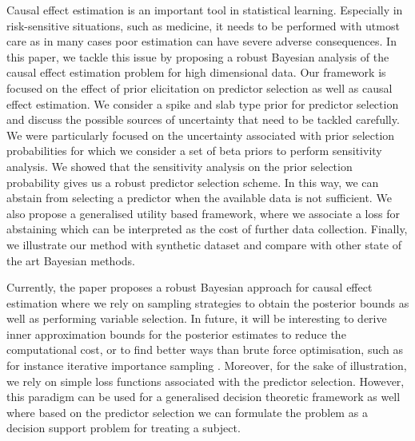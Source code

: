 \documentclass[preprint,12pt]{elsarticle}
\begin{document}
Causal effect estimation is an important tool in statistical learning.
Especially in risk-sensitive situations, such as medicine, it needs to
be performed with utmost care as in many cases poor estimation can have severe adverse consequences.
In this paper, we tackle this issue by proposing a robust Bayesian analysis of the causal 
effect estimation problem for high dimensional data. Our 
framework is focused on the effect of prior elicitation on
predictor selection
as well as causal effect estimation. We consider a spike and slab type
prior for predictor selection and discuss the possible sources of uncertainty that
need to be tackled carefully. We were particularly focused on the uncertainty associated
with prior selection probabilities for which we consider a set of beta priors to perform
sensitivity analysis. We showed that the sensitivity analysis on the prior selection probability
gives us a robust predictor selection scheme. In this way, we can abstain from selecting
a predictor when the available data is not sufficient. We also propose a generalised
utility based framework, where we associate a loss for abstaining which can be interpreted 
as the cost of further data collection. Finally, we illustrate our method with synthetic dataset
and compare with other state of the art Bayesian methods. 


Currently, the paper proposes a robust Bayesian approach for causal effect estimation where
we rely on sampling strategies to obtain the posterior bounds as well as performing 
variable selection. In future, it will be interesting to derive inner approximation bounds
for the posterior estimates to reduce the computational cost,
or to find better ways than brute force optimisation, such as for instance iterative importance sampling \citep{cruz22_importance}. Moreover, for the sake of
illustration, we rely on simple loss functions
associated with the predictor selection. However,
this paradigm can be used for a generalised
decision theoretic framework as well where based on
the predictor selection we can formulate the 
problem as a decision support problem for treating a subject.
\end{document}
